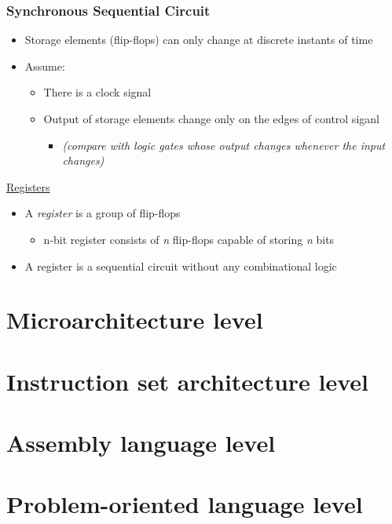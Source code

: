 \documentclass{article}
\begin{document}
\subsubsection{Synchronous Sequential Circuit}
\begin{itemize}
\item Storage elements (flip-flops) can only change at discrete instants of time
\item Assume:
\begin{itemize}
\item There is a clock signal
\item Output of storage elements change only on the edges of control siganl
\begin{itemize}
\item \textit{(compare with logic gates whose output changes whenever the input changes)}
\end{itemize}
\end{itemize}
\end{itemize}

\underline{Registers}
\begin{itemize}
\item A \textit{register} is a group of flip-flops
\begin{itemize}
\item n-bit register consists of \textit{n} flip-flops capable of storing \textit{n} bits
\end{itemize}
\item A register is a sequential circuit without any combinational logic
\end{itemize}

\section{Microarchitecture level}

\section{Instruction set architecture level}

\section{Assembly language level}

\section{Problem-oriented language level}
\end{document}
